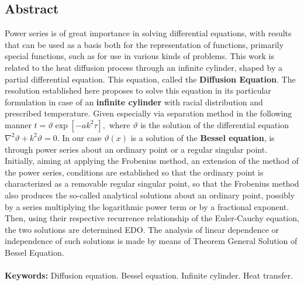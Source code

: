 \thispagestyle{empty}
\begin{center}\section*{Abstract}\end{center}
Power series is of great importance in solving differential equations, with results that can be used as a basis both for the representation of functions, primarily special functions, such as for use in various kinds of problems. This work is related to the heat diffusion process through an infinite cylinder, shaped by a partial differential equation. This equation, called the \textbf{Diffusion Equation}. The resolution established here proposes to solve this equation in its particular formulation in case of an \textbf{infinite cylinder} with racial distribution and prescribed temperature. Given especially via separation method in the following manner $ t = \vartheta \exp[-a k^2 \tau], $ where $ \vartheta $ is the solution of the differential equation $ \nabla^2 \vartheta + k^2 \vartheta = 0 $. In our case $ \vartheta (x) $ is a solution of the \textbf{Bessel equation}, is through power series about an ordinary point or a regular singular point. Initially, aiming at applying the Frobenius method, an extension of the method of the power series, conditions are established so that the ordinary point is characterized as a removable regular singular point, so that the Frobenius method also produces the so-called analytical solutions about an ordinary point, possibly by a series multiplying the logarithmic power term or by a fractional exponent. Then, using their respective recurrence relationship of the Euler-Cauchy equation, the two solutions are determined EDO. The analysis of linear dependence or independence of such solutions is made by means of Theorem General Solution of Bessel Equation.
\\
\\
\textbf{Keywords:} Diffusion equation. Bessel equation. Infinite cylinder. Heat transfer.

